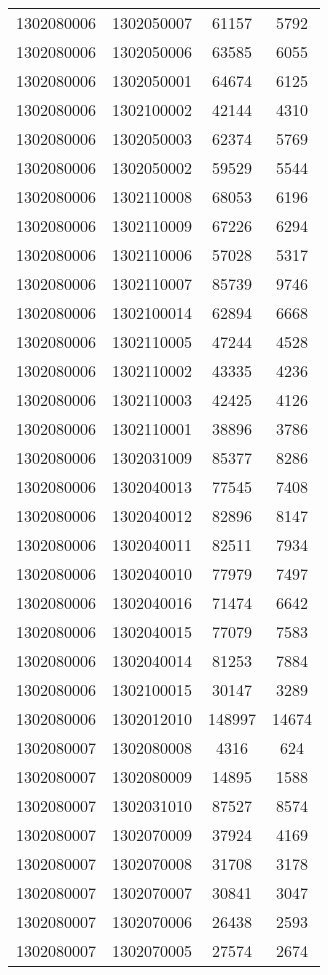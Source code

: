\begin{longtable}{llcc}
1302080006 & 1302050007 & 61157 & 5792\\
1302080006 & 1302050006 & 63585 & 6055\\
1302080006 & 1302050001 & 64674 & 6125\\
1302080006 & 1302100002 & 42144 & 4310\\
1302080006 & 1302050003 & 62374 & 5769\\
1302080006 & 1302050002 & 59529 & 5544\\
1302080006 & 1302110008 & 68053 & 6196\\
1302080006 & 1302110009 & 67226 & 6294\\
1302080006 & 1302110006 & 57028 & 5317\\
1302080006 & 1302110007 & 85739 & 9746\\
1302080006 & 1302100014 & 62894 & 6668\\
1302080006 & 1302110005 & 47244 & 4528\\
1302080006 & 1302110002 & 43335 & 4236\\
1302080006 & 1302110003 & 42425 & 4126\\
1302080006 & 1302110001 & 38896 & 3786\\
1302080006 & 1302031009 & 85377 & 8286\\
1302080006 & 1302040013 & 77545 & 7408\\
1302080006 & 1302040012 & 82896 & 8147\\
1302080006 & 1302040011 & 82511 & 7934\\
1302080006 & 1302040010 & 77979 & 7497\\
1302080006 & 1302040016 & 71474 & 6642\\
1302080006 & 1302040015 & 77079 & 7583\\
1302080006 & 1302040014 & 81253 & 7884\\
1302080006 & 1302100015 & 30147 & 3289\\
1302080006 & 1302012010 & 148997 & 14674\\
1302080007 & 1302080008 & 4316 & 624\\
1302080007 & 1302080009 & 14895 & 1588\\
1302080007 & 1302031010 & 87527 & 8574\\
1302080007 & 1302070009 & 37924 & 4169\\
1302080007 & 1302070008 & 31708 & 3178\\
1302080007 & 1302070007 & 30841 & 3047\\
1302080007 & 1302070006 & 26438 & 2593\\
1302080007 & 1302070005 & 27574 & 2674\\

\end{longtable}
